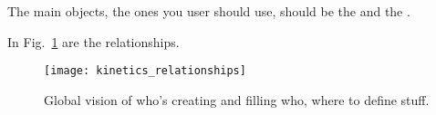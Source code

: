 The main objects, the ones you user should use, should be the
 and the .

In Fig.~\ref{kinpf} are the relationships.
\begin{figure}
\centering
\texttt{[image: kinetics\_relationships]}
\caption[Kinetics program flow]{\label{kinpf}Global vision of who's creating and filling
who, where to define stuff.}
\end{figure}
